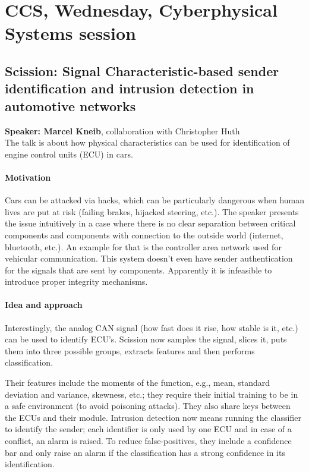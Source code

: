 \documentclass{article}
\begin{document}
\section{CCS, Wednesday, Cyberphysical Systems session}

\subsection{Scission: Signal Characteristic-based sender identification and intrusion detection in automotive networks}
\noindent\textbf{Speaker: Marcel Kneib}, collaboration with Christopher Huth\\

The talk is about how physical characteristics can be used for identification of engine control units (ECU) in cars.

\paragraph{Motivation}
Cars can be attacked via hacks, which can be particularly dangerous when human lives are put at risk (failing brakes, hijacked steering, etc.). The speaker presents the issue intuitively in a case where there is no clear separation between critical components and components with connection to the outside world (internet, bluetooth, etc.). An example for that is the controller area network used for vehicular communication. This system doesn't even have sender authentication for the signals that are sent by components. Apparently it is infeasible to introduce proper integrity mechanisms.

\paragraph{Idea and approach}
Interestingly, the analog CAN signal (how fast does it rise, how stable is it, etc.) can be used to identify ECU's. Scission now samples the signal, slices it, puts them into three possible groups, extracts features and then performs classification.

Their features include the moments of the function, e.g., mean, standard deviation and variance, skewness, etc.; they require their initial training to be in a safe environment (to avoid poisoning attacks). They also share keys between the ECUs and their module. Intrusion detection now means running the classifier to identify the sender; each identifier is only used by one ECU and in case of a conflict, an alarm is raised. To reduce false-positives, they include a confidence bar and only raise an alarm if the classification has a strong confidence in its identification. 
\end{document}
